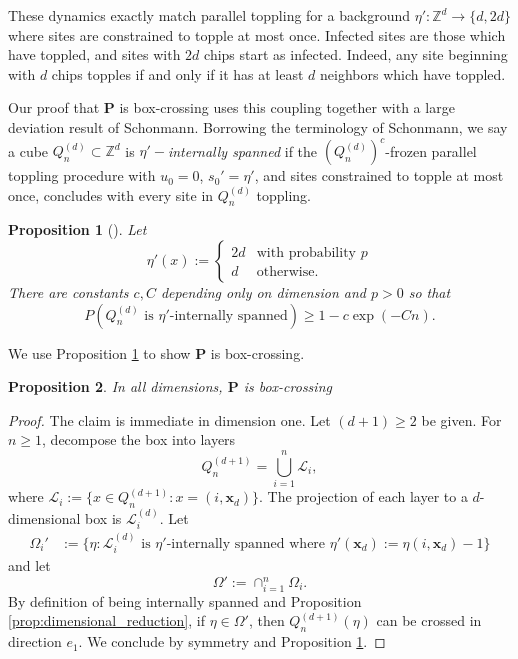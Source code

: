 \documentclass[aap]{imsart}
\newcommand{\Z}{\mathbb{Z}}
\newtheorem{prop}{Proposition}[section]
\begin{document}
These dynamics exactly match parallel toppling for a background $\eta':\Z^d \to \{d, 2 d\}$
where sites are constrained to topple at most once.
Infected sites are those which have toppled, and sites with $2 d$ chips start as infected. Indeed, any 
site beginning with $d$ chips topples if and only if it has at least $d$ neighbors which have toppled.


Our proof that $\mathbf{P}$ is box-crossing uses this coupling together with a large deviation result of Schonmann. Borrowing the terminology of Schonmann, we say a cube $Q_n^{(d)} \subset \Z^d$ is $\eta'-${\it internally spanned}
if the $(Q_n^{(d)})^c$-frozen parallel toppling procedure with $u_0 = 0$, $s_0' = \eta'$, and sites constrained to topple at most once, concludes with every site in $Q_n^{(d)}$ toppling. 




\begin{prop}[\cite{schonmann1992behavior}] \label{prop:schonnmann_bootstrap}
	Let
	\[
	\eta'(x) := \begin{cases} 2 d &\mbox{with probability $p$} \\
	d &\mbox{otherwise.}
	\end{cases}
	\]
	There are constants $c,C$ depending only on dimension and $p > 0$
	so that 
	\begin{equation}
	P(\mbox{$Q_n^{(d)}$ is $\eta'$-internally spanned}) \geq 1 -  c \exp(-C n).
	\end{equation}
\end{prop}


We use Proposition \ref{prop:schonnmann_bootstrap} to show $\mathbf{P}$ is box-crossing. 

\begin{prop}
	In all dimensions, $\mathbf{P}$ is box-crossing
\end{prop}
\begin{proof}
	The claim is immediate in dimension one.
	Let $(d+1) \geq 2$ be given. For $n \geq 1$, decompose the box into layers
	\[
	Q_n^{(d+1)} = \bigcup_{i=1}^{n} \mathcal{L}_i,
	\]
	where $\mathcal{L}_i := \{ x \in Q_n^{(d+1)} : x = (i, \mathbf{x}_d)\}$.
	The projection of each layer to a $d$-dimensional box is $\mathcal{L}_i^{(d)}$. Let 
	\begin{align*}
	\Omega_i' &:= \{\eta : \mbox{$\mathcal{L}_i^{(d)}$ is $\eta'$-internally spanned where $\eta'(\mathbf{x}_d) := \eta(i, \mathbf{x}_d) - 1$} \}
	\end{align*}
	and let 
	\[
	\Omega'  := \cap_{i=1}^n \Omega_i. 
	\]
	By definition of being internally spanned and Proposition \ref{prop:dimensional_reduction}, if $\eta \in \Omega'$, 
	then $Q_n^{(d+1)}(\eta)$ can be crossed in direction $e_1$. We conclude by symmetry and Proposition \ref{prop:schonnmann_bootstrap}.
	
\end{proof}
\end{document}
